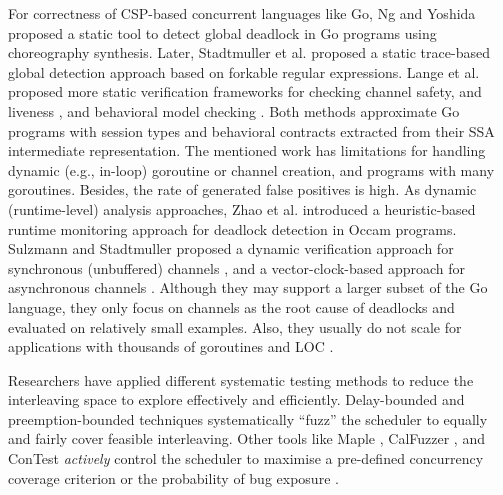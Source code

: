For correctness of CSP-based concurrent languages like Go, Ng and Yoshida \cite{ng-dl-cc16} proposed a static tool to detect global deadlock in Go programs using choreography synthesis.
%
Later, Stadtmuller et al. \cite{stadtmuller-minigo-aplas16} proposed a static trace-based global detection approach based on forkable regular expressions.
%
Lange et al. proposed more static verification frameworks for checking channel safety, and liveness \cite{lange-fence-popl17}, and behavioral model checking \cite{lange-staticType-icse18}.
%
Both methods approximate Go programs with session types and behavioral contracts extracted from their SSA intermediate representation.
%
The mentioned work has limitations for handling dynamic (e.g., in-loop) goroutine or channel creation, and programs with many goroutines. Besides, the rate of generated false positives is high.
%
As dynamic (runtime-level) analysis approaches, Zhao et al. \cite{zhao-occam97} introduced a heuristic-based runtime monitoring approach for deadlock detection in Occam programs.
%
Sulzmann and Stadtmuller proposed a dynamic verification approach for synchronous (unbuffered) channels \cite{sulzmann-corr17}, and a vector-clock-based approach for asynchronous channels \cite{sulzmann-twophase-2018}.
%
Although they may support a larger subset of the Go language, they only focus on channels as the root cause of deadlocks and evaluated on relatively small examples.
%
Also, they usually do not scale for applications with thousands of goroutines and LOC \cite{dilley-empirical-saner19}.

%
Researchers have applied different systematic testing methods \cite{thomson-concurrencyTesting-ppopp14} to reduce the interleaving space to explore effectively and efficiently.
%
Delay-bounded \cite{emmi-delayBounded-popl11,burckhardt-depthBug-asplos10} and preemption-bounded \cite{madanlal-preemptionBound-pldi07} techniques systematically ``fuzz'' the scheduler to equally and fairly cover feasible interleaving.
%
Other tools like Maple \cite{yu-maple-oopsla12}, CalFuzzer \cite{joshi-calfuzzer},  and ConTest \cite{edelstein2003contest} \textit{actively} control the scheduler to maximise a pre-defined concurrency coverage criterion \cite{hong-syncTesting-issta12} or the probability of bug exposure \cite{burckhardt-depthBug-asplos10}.
